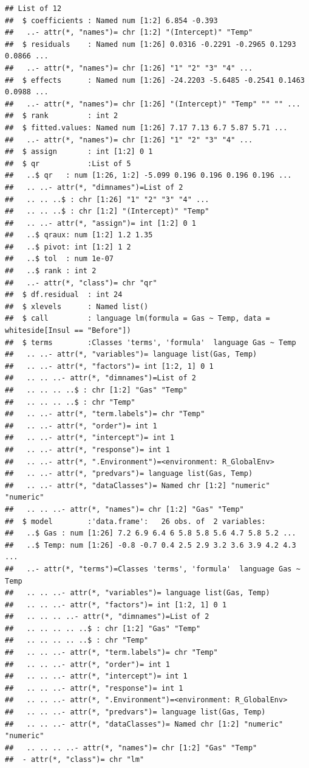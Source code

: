 \documentclass[]{book}
\theoremstyle{definition}
\theoremstyle{definition}
\theoremstyle{definition}
\theoremstyle{remark}
\begin{document}
\begin{verbatim}
## List of 12
##  $ coefficients : Named num [1:2] 6.854 -0.393
##   ..- attr(*, "names")= chr [1:2] "(Intercept)" "Temp"
##  $ residuals    : Named num [1:26] 0.0316 -0.2291 -0.2965 0.1293 0.0866 ...
##   ..- attr(*, "names")= chr [1:26] "1" "2" "3" "4" ...
##  $ effects      : Named num [1:26] -24.2203 -5.6485 -0.2541 0.1463 0.0988 ...
##   ..- attr(*, "names")= chr [1:26] "(Intercept)" "Temp" "" "" ...
##  $ rank         : int 2
##  $ fitted.values: Named num [1:26] 7.17 7.13 6.7 5.87 5.71 ...
##   ..- attr(*, "names")= chr [1:26] "1" "2" "3" "4" ...
##  $ assign       : int [1:2] 0 1
##  $ qr           :List of 5
##   ..$ qr   : num [1:26, 1:2] -5.099 0.196 0.196 0.196 0.196 ...
##   .. ..- attr(*, "dimnames")=List of 2
##   .. .. ..$ : chr [1:26] "1" "2" "3" "4" ...
##   .. .. ..$ : chr [1:2] "(Intercept)" "Temp"
##   .. ..- attr(*, "assign")= int [1:2] 0 1
##   ..$ qraux: num [1:2] 1.2 1.35
##   ..$ pivot: int [1:2] 1 2
##   ..$ tol  : num 1e-07
##   ..$ rank : int 2
##   ..- attr(*, "class")= chr "qr"
##  $ df.residual  : int 24
##  $ xlevels      : Named list()
##  $ call         : language lm(formula = Gas ~ Temp, data = whiteside[Insul == "Before"])
##  $ terms        :Classes 'terms', 'formula'  language Gas ~ Temp
##   .. ..- attr(*, "variables")= language list(Gas, Temp)
##   .. ..- attr(*, "factors")= int [1:2, 1] 0 1
##   .. .. ..- attr(*, "dimnames")=List of 2
##   .. .. .. ..$ : chr [1:2] "Gas" "Temp"
##   .. .. .. ..$ : chr "Temp"
##   .. ..- attr(*, "term.labels")= chr "Temp"
##   .. ..- attr(*, "order")= int 1
##   .. ..- attr(*, "intercept")= int 1
##   .. ..- attr(*, "response")= int 1
##   .. ..- attr(*, ".Environment")=<environment: R_GlobalEnv> 
##   .. ..- attr(*, "predvars")= language list(Gas, Temp)
##   .. ..- attr(*, "dataClasses")= Named chr [1:2] "numeric" "numeric"
##   .. .. ..- attr(*, "names")= chr [1:2] "Gas" "Temp"
##  $ model        :'data.frame':   26 obs. of  2 variables:
##   ..$ Gas : num [1:26] 7.2 6.9 6.4 6 5.8 5.8 5.6 4.7 5.8 5.2 ...
##   ..$ Temp: num [1:26] -0.8 -0.7 0.4 2.5 2.9 3.2 3.6 3.9 4.2 4.3 ...
##   ..- attr(*, "terms")=Classes 'terms', 'formula'  language Gas ~ Temp
##   .. .. ..- attr(*, "variables")= language list(Gas, Temp)
##   .. .. ..- attr(*, "factors")= int [1:2, 1] 0 1
##   .. .. .. ..- attr(*, "dimnames")=List of 2
##   .. .. .. .. ..$ : chr [1:2] "Gas" "Temp"
##   .. .. .. .. ..$ : chr "Temp"
##   .. .. ..- attr(*, "term.labels")= chr "Temp"
##   .. .. ..- attr(*, "order")= int 1
##   .. .. ..- attr(*, "intercept")= int 1
##   .. .. ..- attr(*, "response")= int 1
##   .. .. ..- attr(*, ".Environment")=<environment: R_GlobalEnv> 
##   .. .. ..- attr(*, "predvars")= language list(Gas, Temp)
##   .. .. ..- attr(*, "dataClasses")= Named chr [1:2] "numeric" "numeric"
##   .. .. .. ..- attr(*, "names")= chr [1:2] "Gas" "Temp"
##  - attr(*, "class")= chr "lm"
\end{verbatim}
\end{document}
